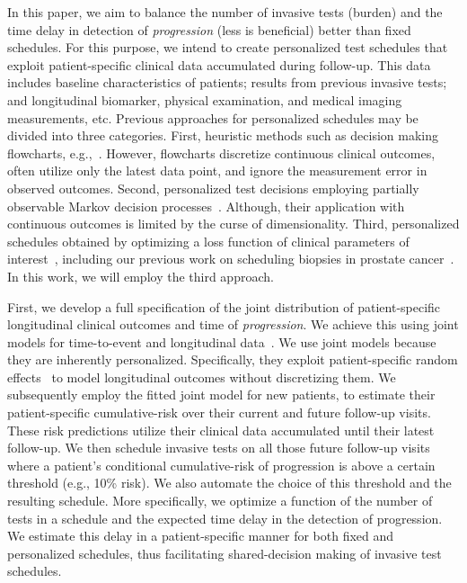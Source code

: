 In this paper, we aim to balance the number of invasive tests (burden) and the time delay in detection of \textit{progression} (less is beneficial) better than fixed schedules. For this purpose, we intend to create personalized test schedules that exploit patient-specific clinical data accumulated during follow-up. This data includes baseline characteristics of patients; results from previous invasive tests; and longitudinal biomarker, physical examination, and medical imaging measurements, etc. Previous approaches for personalized schedules may be divided into three categories. First, heuristic methods such as decision making flowcharts, e.g.,~\citet{bokhorst2015compliance}. However, flowcharts discretize continuous clinical outcomes, often utilize only the latest data point, and ignore the measurement error in observed outcomes. Second, personalized test decisions employing partially observable Markov decision processes~\citep{alagoz2010operations, steimle2017markov}. Although, their application with continuous outcomes is limited by the curse of dimensionality. Third, personalized schedules obtained by optimizing a loss function of clinical parameters of interest~\citep{bebu2017optimal,rizopoulos2015personalized}, including our previous work on scheduling biopsies in prostate cancer~\citep{tomer2019personalized}. In this work, we will employ the third approach.

First, we develop a full specification of the joint distribution of patient-specific longitudinal clinical outcomes and time of \textit{progression}. We achieve this using joint models for time-to-event and longitudinal data~\citep{tsiatis2004joint,rizopoulos2012joint}. We use joint models because they are inherently personalized. Specifically, they exploit patient-specific random effects~\citep{laird1982random} to model longitudinal outcomes without discretizing them. We subsequently employ the fitted joint model for new patients, to estimate their patient-specific cumulative-risk over their current and future follow-up visits. These risk predictions utilize their clinical data accumulated until their latest follow-up. We then schedule invasive tests on all those future follow-up visits where a patient's conditional cumulative-risk of progression is above a certain threshold (e.g., 10\% risk). We also automate the choice of this threshold and the resulting schedule. More specifically, we optimize a function of the number of tests in a schedule and the expected time delay in the detection of progression. We estimate this delay in a patient-specific manner for both fixed and personalized schedules, thus facilitating shared-decision making of invasive test schedules.

